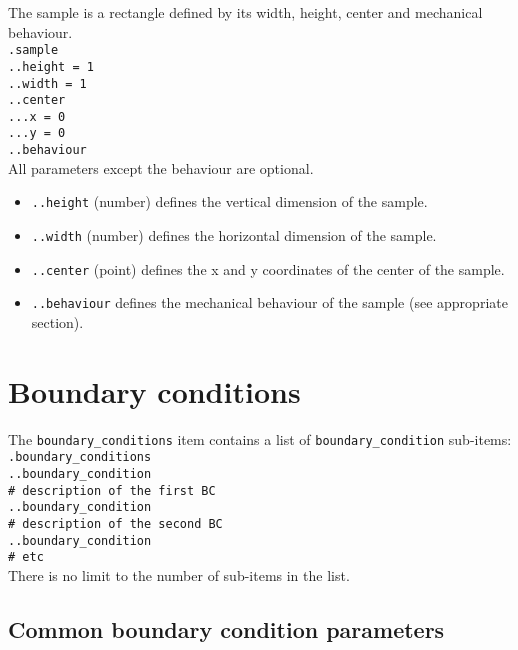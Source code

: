 \documentclass[10pt]{article}
\begin{document}
The sample is a rectangle defined by its width, height, center and mechanical behaviour.\\

\noindent \verb+.sample+\\
\verb+..height = 1+\\
\verb+..width = 1+\\
\verb+..center+\\
\verb+...x = 0+\\
\verb+...y = 0+\\
\verb+..behaviour+\\

All parameters except the behaviour are optional.

\begin{itemize}[label=]
	\item \verb+..height+ (number) defines the vertical dimension of the sample.
	\item \verb+..width+ (number) defines the horizontal dimension of the sample.
	\item \verb+..center+ (point) defines the x and y coordinates of the center of the sample.
	\item \verb+..behaviour+ defines the mechanical behaviour of the sample (see appropriate section).
\end{itemize}

\eject

\section{Boundary conditions}

The \verb+boundary_conditions+ item contains a list of \verb+boundary_condition+ sub-items:\\

\noindent \verb+.boundary_conditions+\\
\verb+..boundary_condition+\\
\verb+# description of the first BC+\\
\verb+..boundary_condition+\\
\verb+# description of the second BC+\\
\verb+..boundary_condition+\\
\verb+# etc+\\

There is no limit to the number of sub-items in the list.

\subsection{Common boundary condition parameters}
\end{document}
